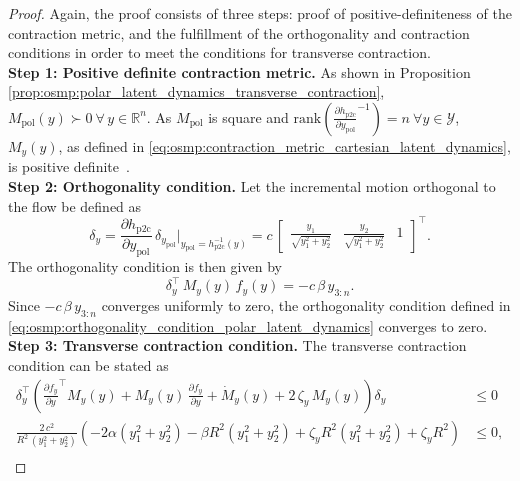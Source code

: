 \begin{proof}
    Again, the proof consists of three steps: proof of positive-definiteness of the contraction metric, and the fulfillment of the orthogonality and contraction conditions in order to meet the conditions for transverse contraction.\\
    \textbf{Step 1: Positive definite contraction metric.} As shown in Proposition \ref{prop:osmp:polar_latent_dynamics_transverse_contraction}, $M_\mathrm{pol}(y) \succ 0 \: \forall \, y \in \mathbb{R}^n$. As $M_\mathrm{pol}$ is square and $\mathrm{rank} \left ( \frac{\partial h_{\mathrm{p2c}}}{\partial y_\mathrm{pol}}^{-1} \right ) = n \: \forall y \in \mathcal{Y}$, $M_y(y)$, as defined in \eqref{eq:osmp:contraction_metric_cartesian_latent_dynamics}, is positive definite~\citep{petersen2008matrix}.\\
    \textbf{Step 2: Orthogonality condition.} Let the incremental motion orthogonal to the flow be defined as
    \begin{equation}
        \delta_y = \frac{\partial h_{\mathrm{p2c}}}{\partial y_\mathrm{pol}} \, \delta_{y_\mathrm{pol}} \bigg |_{y_\mathrm{pol} = h_\mathrm{p2c}^{-1}(y)} = c \, \begin{bmatrix}
        \frac{y_1}{\sqrt{y_1^2 + y_2^2}} & \frac{y_2}{\sqrt{y_1^2 + y_2^2}} & 1
    \end{bmatrix}^\top.
    \end{equation}
    The orthogonality condition is then given by
    \begin{equation}
        \delta_y^\top \, M_y(y) \, f_y(y) = -c \, \beta \, y_{3:n}.
    \end{equation}
    Since $-c \, \beta \, y_{3:n}$ converges uniformly to zero, the orthogonality condition defined in \eqref{eq:osmp:orthogonality_condition_polar_latent_dynamics} converges to zero.\\
    \textbf{Step 3: Transverse contraction condition.} 
    The transverse contraction condition can be stated as
    \begin{equation}
    \begin{split}
        \delta_{y}^\top \left ( \frac{\partial f_y}{\partial y}^\top M_y(y) + M_y(y) \, \frac{\partial f_y}{\partial y} + \dot{M}_y(y) + 2 \, \zeta_y \, M_y(y) \right ) \delta_{y} &\leq 0\\
        \frac{2 \, c^2}{R^2 \, (y_1^2 + y_2^2)} \left ( - 2 \alpha (y_1^2 + y_2^2) - \beta R^2 (y_1^2 + y_2^2) + \zeta_y R^2 (y_1^2 + y_2^2) + \zeta_y R^2 \right ) & \leq 0,\\

\end{split}
\end{equation}
\end{proof}
